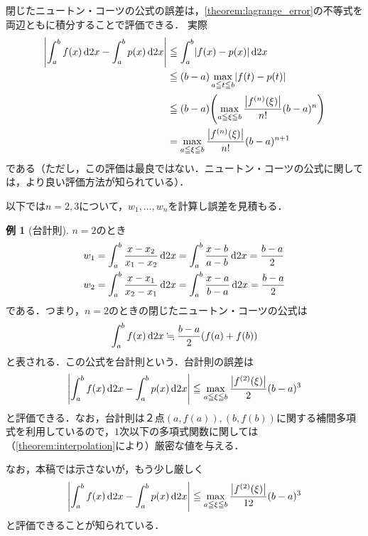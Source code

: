 \documentclass[a4paper]{ltjsarticle}
\theoremstyle{definition}
\newtheorem{example}{例}[section]
\DeclarePairedDelimiter{\abs}{\lvert}{\rvert}
\DeclarePairedDelimiter{\pqty}{\lparen}{\rparen}
\newcommand{\dd}[1]{\dl2#1}
\begin{document}
閉じたニュートン・コーツの公式の誤差は，\cref{theorem:lagrange_error}の不等式を両辺ともに積分することで評価できる．
実際
\begin{align*}
  \abs*{\int_a^b f(x) \dd{x} - \int_a^b p(x) \dd{x}}
  &\leqq \int_a^b \abs*{f(x) - p(x)} \dd{x} \\
  &\leqq (b-a)\max_{a\leqq t\leqq b} \abs*{f(t) - p(t)} \\
  &\leqq (b-a)\pqty*{\max_{a\leqq\xi\leqq b} \frac{\abs*{f^{(n)}(\xi)}}{n!} (b-a)^n} \\
  &= \max_{a\leqq\xi\leqq b} \frac{\abs*{f^{(n)}(\xi)}}{n!} (b-a)^{n+1}
\end{align*}
である（ただし，この評価は最良ではない．ニュートン・コーツの公式に関しては，より良い評価方法が知られている）．

以下では$n=2,3$について，$w_1,\dots,w_n$を計算し誤差を見積もる．

\begin{example}[台計則]
  $n=2$のとき
  \begin{align*}
    w_1
    &= \int_a^b \frac{x-x_2}{x_1-x_2} \dd{x}
     = \int_a^b \frac{x-b}{a-b} \dd{x}
     = \frac{b-a}{2} \\
    w_2
    &= \int_a^b \frac{x-x_1}{x_2-x_1} \dd{x}
     = \int_a^b \frac{x-a}{b-a} \dd{x}
     = \frac{b-a}{2}
  \end{align*}
  である．つまり，$n=2$のときの閉じたニュートン・コーツの公式は
  \[
    \int_a^b f(x) \dd{x} \fallingdotseq \frac{b-a}{2} \pqty*{f(a)+f(b)}
  \]
  と表される．この公式を台計則という．台計則の誤差は
  \[
    \abs*{\int_a^b f(x) \dd{x} - \int_a^b p(x) \dd{x}}
    \leqq \max_{a\leqq\xi\leqq b} \frac{\abs*{f^{(2)}(\xi)}}{2} (b-a)^3
  \]
  と評価できる．なお，台計則は２点$(a,f(a)),(b,f(b))$に関する補間多項式を利用しているので，$1$次以下の多項式関数に関しては（\cref{theorem:interpolation}により）厳密な値を与える．

  なお，本稿では示さないが，もう少し厳しく
  \[
    \abs*{\int_a^b f(x) \dd{x} - \int_a^b p(x) \dd{x}} \leqq \max_{a\leqq\xi\leqq b} \frac{\abs*{f^{(2)}(\xi)}}{12} (b-a)^3
  \]
  と評価できることが知られている\cite{kikuchi}．
\end{example}
\end{document}
